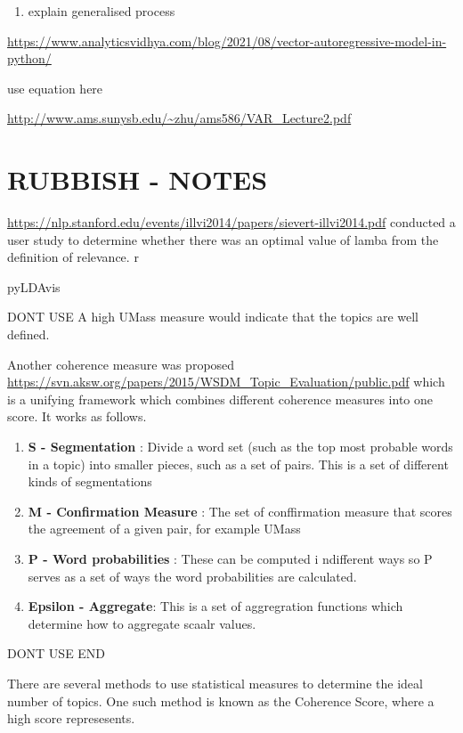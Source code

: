 \documentclass[
]{article}
\providecommand{\tightlist}{%
  \setlength{\itemsep}{0pt}\setlength{\parskip}{0pt}}
\begin{document}
\begin{enumerate}
\def\labelenumi{\arabic{enumi}.}
\setcounter{enumi}{2}
\tightlist
\item
  explain generalised process
\end{enumerate}

\url{https://www.analyticsvidhya.com/blog/2021/08/vector-autoregressive-model-in-python/}

use equation here

\url{http://www.ams.sunysb.edu/~zhu/ams586/VAR_Lecture2.pdf}

\hypertarget{rubbish---notes}{%
\section{RUBBISH - NOTES}\label{rubbish---notes}}

\url{https://nlp.stanford.edu/events/illvi2014/papers/sievert-illvi2014.pdf}
conducted a user study to determine whether there was an optimal value
of lamba from the definition of relevance. r

pyLDAvis

DONT USE A high UMass measure would indicate that the topics are well
defined.

Another coherence measure was proposed
\url{https://svn.aksw.org/papers/2015/WSDM_Topic_Evaluation/public.pdf}
which is a unifying framework which combines different coherence
measures into one score. It works as follows.

\begin{enumerate}
\def\labelenumi{\arabic{enumi}.}
\tightlist
\item
  \textbf{S - Segmentation} : Divide a word set (such as the top most
  probable words in a topic) into smaller pieces, such as a set of
  pairs. This is a set of different kinds of segmentations
\item
  \textbf{M - Confirmation Measure} : The set of conffirmation measure
  that scores the agreement of a given pair, for example UMass
\item
  \textbf{P - Word probabilities} : These can be computed i ndifferent
  ways so P serves as a set of ways the word probabilities are
  calculated.
\item
  \textbf{Epsilon - Aggregate}: This is a set of aggregration functions
  which determine how to aggregate scaalr values.
\end{enumerate}

DONT USE END

There are several methods to use statistical measures to determine the
ideal number of topics. One such method is known as the Coherence Score,
where a high score represesents.
\end{document}
